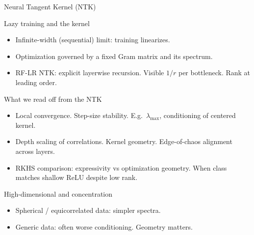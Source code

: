 \documentclass[aspectratio=169]{beamer}
\begin{document}
\begin{frame}{Neural Tangent Kernel (NTK)}
  \small
  \begin{block}{Lazy training and the kernel}
    \begin{itemize}
      \item Infinite-width (sequential) limit: training linearizes.
      \item Optimization governed by a fixed Gram matrix and its spectrum.
      \item RF-LR NTK: explicit layerwise recursion. Visible $1/r$ per bottleneck. Rank at leading order.
    \end{itemize}
  \end{block}
  \begin{exampleblock}{What we read off from the NTK}
    \begin{itemize}
      \item Local convergence. Step-size stability. E.g.\ $\lambda_{\max}$, conditioning of centered kernel.
      \item Depth scaling of correlations. Kernel geometry. Edge-of-chaos alignment across layers.
      \item RKHS comparison: expressivity vs optimization geometry. When class matches shallow ReLU despite low rank.
    \end{itemize}
  \end{exampleblock}
  \begin{alertblock}{High-dimensional and concentration}
    \begin{itemize}
      \item Spherical / equicorrelated data: simpler spectra.
      \item Generic data: often worse conditioning. Geometry matters.
    \end{itemize}
  \end{alertblock}
\end{frame}
\end{document}
